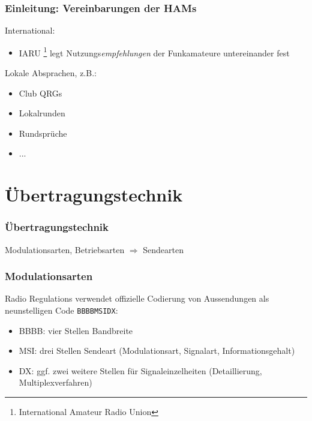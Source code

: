 \begin{frame}
    \frametitle{Einleitung: Vereinbarungen der HAMs}

    International:

    \begin{itemize}
        \item IARU \footnote{International Amateur Radio Union} legt
              Nutzungs\emph{empfehlungen} der Funkamateure untereinander fest
    \end{itemize}

    Lokale Absprachen, z.B.:

    \begin{itemize}
        \item Club QRGs
        \item Lokalrunden
        \item Rundsprüche
        \item ...
    \end{itemize}

\end{frame}

\section[Übertragungstechn.]{Übertragungstechnik}

\begin{frame}
    \frametitle{Übertragungstechnik}
        
    \begin{center}
        Modulationsarten, Betriebsarten $\Rightarrow$ Sendearten
    \end{center}

\end{frame}

\begin{frame}
    \frametitle{Modulationsarten}

    Radio Regulations verwendet offizielle Codierung von Aussendungen als
    neunstelligen Code \texttt{BBBBMSIDX}: \\[2em]

    \begin{itemize}
        \item BBBB: vier Stellen Bandbreite
        \item MSI: drei Stellen Sendeart (Modulationsart, Signalart,
                   Informationsgehalt)
        \item DX: ggf. zwei weitere Stellen für Signaleinzelheiten
                  (Detaillierung, Multiplexverfahren)
    \end{itemize}

\end{frame}

